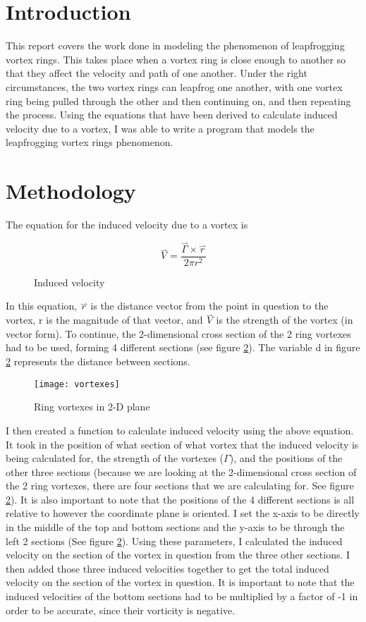 \documentclass{article}
\newcommand{\vect}{\overset{\rightharpoonup}}
\begin{document}
\section{Introduction}
This report covers the work done in modeling the phenomenon of leapfrogging vortex rings. This takes place when a vortex ring is close enough to another so that they affect the velocity and path of one another. Under the right circumstances, the two vortex rings can leapfrog one another, with one vortex ring being pulled through the other and then continuing on, and then repeating the process. Using the equations that have been derived to calculate induced velocity due to a vortex, I was able to write a program that models the leapfrogging vortex rings phenomenon.

\section{Methodology}
The equation for the induced velocity due to a vortex is

\begin{figure}[h!]
    \centering
    \[\vect{V} = \frac{\vect{\Gamma}\times\vect{r}}{2\pi r^2}\]
    \caption{Induced velocity}
    \label{eqn:velocity}
\end{figure}

In this equation, $\vect{r}$ is the distance vector from the point in question to the vortex, r is the magnitude of that vector, and $\vect{V}$ is the strength of the vortex (in vector form). To continue, the 2-dimensional cross section of the 2 ring vortexes had to be used, forming 4 different sections (see figure \ref{fig:vortexes}). The variable d in figure \ref{fig:vortexes} represents the distance between sections.

\begin{figure}
\centering
\texttt{[image: vortexes]}
\caption{Ring vortexes in 2-D plane}
\label{fig:vortexes}
\end{figure}

I then created a function to calculate induced velocity using the above equation. It took in the position of what section of what vortex that the induced velocity is being calculated for, the strength of the vortexes (\(\Gamma\)), and the positions of the other three sections (because we are looking at the 2-dimensional cross section of the 2 ring vortexes, there are four sections that we are calculating for. See figure \ref{fig:vortexes}). It is also important to note that the positions of the 4 different sections is all relative to however the coordinate plane is oriented. I set the x-axis to be directly in the middle of the top and bottom sections and the y-axis to be through the left 2 sections (See figure \ref{fig:vortexes}). Using these parameters, I calculated the induced velocity on the section of the vortex in question from the three other sections. I then added those three induced velocities together to get the total induced velocity on the section of the vortex in question. It is important to note that the induced velocities of the bottom sections had to be multiplied by a factor of -1 in order to be accurate, since their vorticity is negative.
\end{document}
